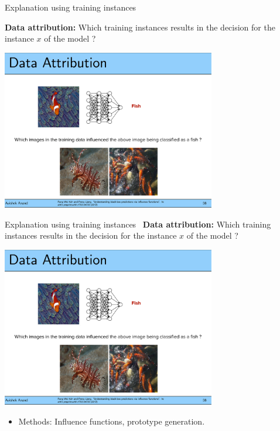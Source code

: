 \documentclass[11pt,compress,t,notes=noshow, aspectratio=169, xcolor=table]{beamer}
\begin{document}
\begin{frame}{Explanation using training instances~}

	\textbf{Data attribution:} Which training instances results in the decision for the instance $x$ of the model ?
	\begin{center}
		\includegraphics[page=1, width=0.7\textwidth]{figure/fish-attribution.pdf}
	\end{center}
\end{frame}

\begin{frame}{Explanation using training instances~}
	\textbf{Data attribution:} Which training instances results in the decision for the instance $x$ of the model ?
	\begin{center}
		\includegraphics[page=1, width=0.7\textwidth]{figure/prototypes-fish.pdf}
	\end{center}
	\begin{itemize}
		\item Methods:
		Influence functions, prototype generation.
	\end{itemize}
\end{frame}
\end{document}
